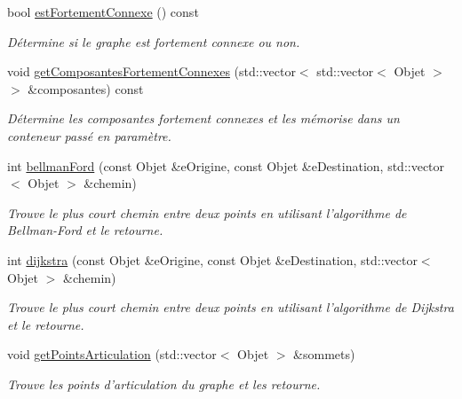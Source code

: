 \begin{DoxyCompactItemize}
bool \hyperlink{class_graphe_abdc4f27fc9498cc3814d03a97c87b7e7}{estFortementConnexe} () const 
\begin{DoxyCompactList}\small\item\em Détermine si le graphe est fortement connexe ou non. \end{DoxyCompactList}\item 
void \hyperlink{class_graphe_ad63af90bd6395092dfe311a36f15833c}{getComposantesFortementConnexes} (std::vector$<$ std::vector$<$ Objet $>$ $>$ \&composantes) const 
\begin{DoxyCompactList}\small\item\em Détermine les composantes fortement connexes et les mémorise dans un conteneur passé en paramètre. \end{DoxyCompactList}\item 
int \hyperlink{class_graphe_a077802b65dad92e0d7e593abbca17478}{bellmanFord} (const Objet \&eOrigine, const Objet \&eDestination, std::vector$<$ Objet $>$ \&chemin)
\begin{DoxyCompactList}\small\item\em Trouve le plus court chemin entre deux points en utilisant l'algorithme de Bellman-\/Ford et le retourne. \end{DoxyCompactList}\item 
int \hyperlink{class_graphe_a46ea944cd82af0d14b67ed66ac57261f}{dijkstra} (const Objet \&eOrigine, const Objet \&eDestination, std::vector$<$ Objet $>$ \&chemin)
\begin{DoxyCompactList}\small\item\em Trouve le plus court chemin entre deux points en utilisant l'algorithme de Dijkstra et le retourne. \end{DoxyCompactList}\item 
void \hyperlink{class_graphe_acf31ba4346b58850d69ba22ee75bdf48}{getPointsArticulation} (std::vector$<$ Objet $>$ \&sommets)
\begin{DoxyCompactList}\small\item\em Trouve les points d'articulation du graphe et les retourne. \end{DoxyCompactList}\end{DoxyCompactItemize}
